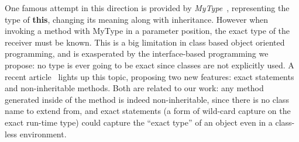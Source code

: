 One famous attempt in this direction is provided by
\emph{MyType}~\cite{bruce1994paradigmatic}, representing the type of
\textbf{this}, changing its meaning along with inheritance. However when
invoking a method with MyType in a parameter position, the exact type of the
receiver must be known.  This is a big limitation in class based object oriented
programming, and is exasperated by the interface-based programming we propose: no
type is ever going to be exact since classes are not explicitly used. A recent
article~\cite{Saito2013933} lights up this topic, proposing two
new features: exact statements and non-inheritable methods. Both are
related to our work: any method generated inside of the \Q@of@ method is indeed
non-inheritable, since there is no class name to extend from, and exact
statements (a form of wild-card capture on the exact run-time type) could
capture the ``exact type'' of an object even in a class-less environment.






